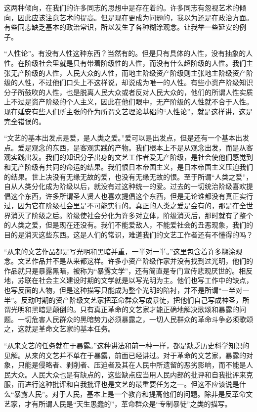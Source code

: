 这两种倾向，在我们的许多同志的思想中是存在着的。许多同志有忽视艺术的倾向，因此应该注意艺术的提高。但是现在更成为问题的，我以为还是在政治方面。有些同志缺乏基本的政治常识，所以发生了各种糊涂观念。让我举一些延安的例子。

“人性论”。有没有人性这种东西？当然有的。但是只有具体的人性，没有抽象的人性。在阶级社会里就是只有带着阶级性的人性，而没有什么超阶级的人性。我们主张无产阶级的人性，人民大众的人性，而地主阶级资产阶级则主张地主阶级资产阶级的人性，不过他们口头上不这样说，却说成为唯一的人性。有些小资产阶级知识分子所鼓吹的人性，也是脱离人民大众或者反对人民大众的，他们的所谓人性实质上不过是资产阶级的个人主义，因此在他们眼中，无产阶级的人性就不合于人性。现在延安有些人们所主张的作为所谓文艺理论基础的“人性论”，就是这样讲，这是完全错误的。

“文艺的基本出发点是爱，是人类之爱。”爱可以是出发点，但是还有一个基本出发点。爱是观念的东西，是客观实践的产物。我们根本上不是从观念出发，而是从客观实践出发。我们的知识分子出身的文艺工作者爱无产阶级，是社会使他们感觉到和无产阶级有共同的命运的结果。我们恨日本帝国主义，是日本帝国主义压迫我们的结果。世上决没有无缘无故的爱，也没有无缘无故的恨。至于所谓“人类之爱”，自从人类分化成为阶级以后，就没有过这种统一的爱。过去的一切统治阶级喜欢提倡这个东西，许多所谓圣人贤人也喜欢提倡这个东西，但是无论谁都没有真正实行过，因为它在阶级社会里是不可能实行的。真正的人类之爱是会有的，那是在全世界消灭了阶级之后。阶级使社会分化为许多对立体，阶级消灭后，那时就有了整个的人类之爱，但是现在还没有。我们不能爱敌人，不能爱社会的丑恶现象，我们的目的是消灭这些东西。这是人们的常识，难道我们的文艺工作者还有不懂得的吗？

“从来的文艺作品都是写光明和黑暗并重，一半对一半。”这里包含着许多糊涂观念。文艺作品并不是从来都这样。许多小资产阶级作家并没有找到过光明，他们的作品就只是暴露黑暗，被称为“暴露文学”，还有简直是专门宣传悲观厌世的。相反地，苏联在社会主义建设时期的文学就是以写光明为主。他们也写工作中的缺点，也写反面的人物，但是这种描写只能成为整个光明的陪衬，并不是所谓“一半对一半”。反动时期的资产阶级文艺家把革命群众写成暴徒，把他们自己写成神圣，所谓光明和黑暗是颠倒的。只有真正革命的文艺家才能正确地解决歌颂和暴露的问题。一切危害人民群众的黑暗势力必须暴露之，一切人民群众的革命斗争必须歌颂之，这就是革命文艺家的基本任务。

“从来文艺的任务就在于暴露。”这种讲法和前一种一样，都是缺乏历史科学知识的见解。从来的文艺并不单在于暴露，前面已经讲过。对于革命的文艺家，暴露的对象，只能是侵略者、剥削者、压迫者及其在人民中所遗留的恶劣影响，而不能是人民大众。人民大众也是有缺点的，这些缺点应当用人民内部的批评和自我批评来克服，而进行这种批评和自我批评也是文艺的最重要任务之一。但这不应该说是什么“暴露人民”。对于人民，基本上是一个教育和提高他们的问题。除非是反革命文艺家，才有所谓人民是“天生愚蠢的”，革命群众是“专制暴徒”之类的描写。

